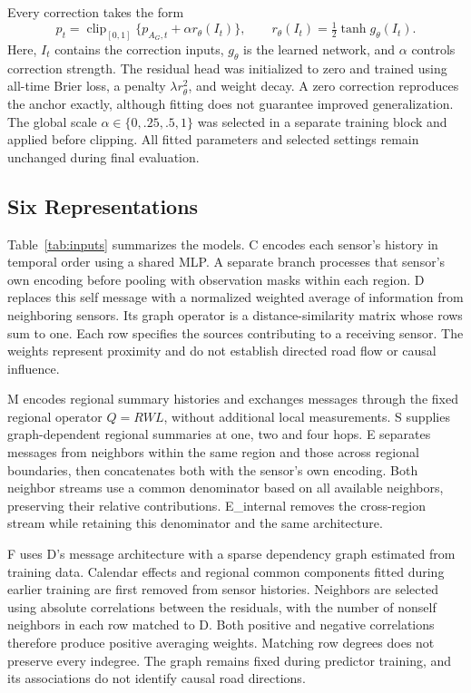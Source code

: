 \documentclass{llncs}
\begin{document}
Every correction takes the form
\begin{equation}
 p_t=\operatorname{clip}_{[0,1]}\{p_{A_G,t}+\alpha r_\theta(I_t)\},
 \qquad r_\theta(I_t)=\tfrac12\tanh g_\theta(I_t).
\label{eq:correction}
\end{equation}
Here, $I_t$ contains the correction inputs, $g_\theta$ is the learned network, and $\alpha$ controls correction strength. The residual head was initialized to zero and trained using all-time Brier loss, a penalty $\lambda r_\theta^2$, and weight decay. A zero correction reproduces the anchor exactly, although fitting does not guarantee improved generalization. The global scale $\alpha\in\{0,\allowbreak .25,\allowbreak .5,1\}$ was selected in a separate training block and applied before clipping. All fitted parameters and selected settings remain unchanged during final evaluation.




\subsection{Six Representations}
Table~\ref{tab:inputs} summarizes the models. C encodes each sensor's history in temporal order using a shared MLP. A separate branch processes that sensor's own encoding before pooling with observation masks within each region. D replaces this self message with a normalized weighted average of information from neighboring sensors. Its graph operator is a distance-similarity matrix whose rows sum to one. Each row specifies the sources contributing to a receiving sensor. The weights represent proximity and do not establish directed road flow or causal influence.

M encodes regional summary histories and exchanges messages through the fixed regional operator $Q=RWL$, without additional local measurements. S supplies graph-dependent regional summaries at one, two and four hops. E separates messages from neighbors within the same region and those across regional boundaries, then concatenates both with the sensor's own encoding. Both neighbor streams use a common denominator based on all available neighbors, preserving their relative contributions. E\_internal removes the cross-region stream while retaining this denominator and the same architecture.

F uses D's message architecture with a sparse dependency graph estimated from training data. Calendar effects and regional common components fitted during earlier training are first removed from sensor histories. Neighbors are selected using absolute correlations between the residuals, with the number of nonself neighbors in each row matched to D. Both positive and negative correlations therefore produce positive averaging weights. Matching row degrees does not preserve every indegree. The graph remains fixed during predictor training, and its associations do not identify causal road directions.
\end{document}
